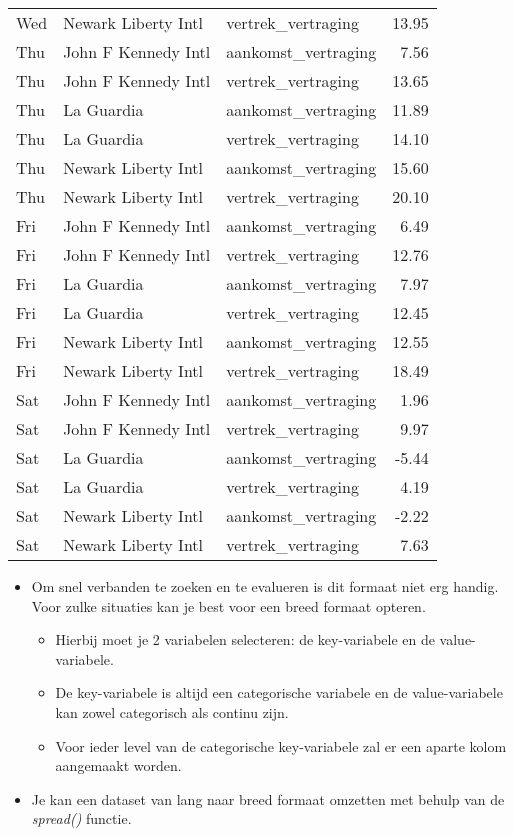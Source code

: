 \documentclass[]{memoir}
\providecommand{\tightlist}{%
  \setlength{\itemsep}{0pt}\setlength{\parskip}{0pt}}
\begin{document}
\begin{table}[t]
\begin{tabular}{lllr}
Wed & Newark Liberty Intl & vertrek\_vertraging & 13.95\\
Thu & John F Kennedy Intl & aankomst\_vertraging & 7.56\\
\addlinespace
Thu & John F Kennedy Intl & vertrek\_vertraging & 13.65\\
Thu & La Guardia & aankomst\_vertraging & 11.89\\
Thu & La Guardia & vertrek\_vertraging & 14.10\\
Thu & Newark Liberty Intl & aankomst\_vertraging & 15.60\\
Thu & Newark Liberty Intl & vertrek\_vertraging & 20.10\\
\addlinespace
Fri & John F Kennedy Intl & aankomst\_vertraging & 6.49\\
Fri & John F Kennedy Intl & vertrek\_vertraging & 12.76\\
Fri & La Guardia & aankomst\_vertraging & 7.97\\
Fri & La Guardia & vertrek\_vertraging & 12.45\\
Fri & Newark Liberty Intl & aankomst\_vertraging & 12.55\\
\addlinespace
Fri & Newark Liberty Intl & vertrek\_vertraging & 18.49\\
Sat & John F Kennedy Intl & aankomst\_vertraging & 1.96\\
Sat & John F Kennedy Intl & vertrek\_vertraging & 9.97\\
Sat & La Guardia & aankomst\_vertraging & -5.44\\
Sat & La Guardia & vertrek\_vertraging & 4.19\\
\addlinespace
Sat & Newark Liberty Intl & aankomst\_vertraging & -2.22\\
Sat & Newark Liberty Intl & vertrek\_vertraging & 7.63\\
\bottomrule
\end{tabular}
\end{table}

\begin{itemize}
\tightlist
\item
  Om snel verbanden te zoeken en te evalueren is dit formaat niet erg handig. Voor zulke situaties kan je best voor een breed formaat opteren.

  \begin{itemize}
  \tightlist
  \item
    Hierbij moet je 2 variabelen selecteren: de key-variabele en de value-variabele.
  \item
    De key-variabele is altijd een categorische variabele en de value-variabele kan zowel categorisch als continu zijn.
  \item
    Voor ieder level van de categorische key-variabele zal er een aparte kolom aangemaakt worden.
  \end{itemize}
\item
  Je kan een dataset van lang naar breed formaat omzetten met behulp van de \emph{spread()} functie.
\end{itemize}
\end{document}
